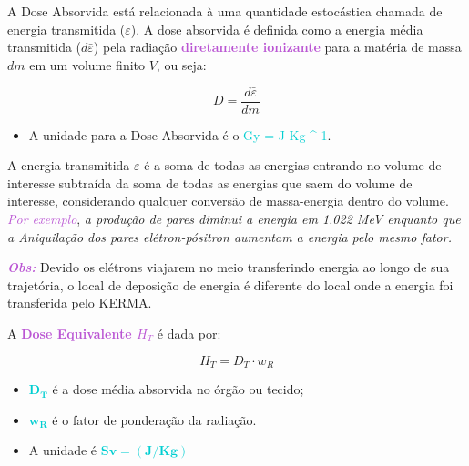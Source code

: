 \documentclass[11pt,a4paper]{article}
\newcounter{exemplo}
\begin{document}
		
		A Dose  Absorvida está relacionada à uma quantidade estocástica chamada de energia transmitida ($\varepsilon$). A dose absorvida é definida como a energia média transmitida ($d\bar{\varepsilon}$) pela radiação \textcolor{MediumOrchid}{\textbf{diretamente ionizante}} para a matéria de massa $dm$ em um volume finito $V$, ou seja:


			\begin{equation}
				D = \frac{d \bar{\varepsilon}}{d m}
			\end{equation}

		\begin{exemplo}[Unidade]
			\begin{itemize}
				\item A unidade para a Dose Absorvida é o \textcolor{DarkTurquoise}{Gy = \unit{J \cdot Kg ^{-1}}}.
			\end{itemize}
		\end{exemplo}
		

		A energia transmitida $\varepsilon$ é a soma de todas as energias entrando no volume de interesse subtraída da soma de todas as energias que saem do volume de interesse, considerando qualquer conversão de massa-energia dentro do volume. \textcolor{MediumOrchid}{\textit{Por exemplo}},\textit{ a produção de pares diminui a energia em 1.022 MeV enquanto que a Aniquilação dos pares elétron-pósitron aumentam a energia pelo mesmo fator.}

		\textcolor{MediumOrchid}{\textit{\textbf{Obs:}}} Devido os elétrons viajarem no meio transferindo energia ao longo de sua trajetória, o local de deposição de energia é diferente do local onde a energia foi transferida pelo KERMA. 

		A \textbf{\textcolor{MediumOrchid}{Dose Equivalente $H_T$}} é dada por:

		\begin{equation}
			H_T = D_T \cdot w_R
		\end{equation}
	
		\begin{exemplo}[onde,]
			\begin{itemize}
				\item \textcolor{DarkTurquoise}{$\mathbf{D_T}$} é a dose média absorvida no órgão ou tecido;
				\item \textcolor{DarkTurquoise}{$\mathbf{w_{\text{R}}}$}  é o fator de ponderação da radiação.
				\item A unidade é  \textcolor{DarkTurquoise}{$\mathbf{Sv = (J/Kg)}$}
			\end{itemize}
		\end{exemplo}
\end{document}

